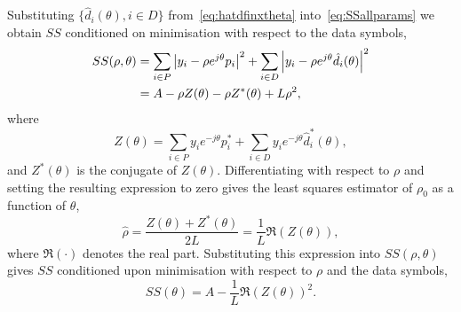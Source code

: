 \documentclass[journal]{IEEEtran}
\begin{document}
Substituting $\{ \hat{d}_i(\theta), i \in D \}$ from~\eqref{eq:hatdfinxtheta} into~\eqref{eq:SSallparams} we obtain $SS$ conditioned on minimisation with respect to the data symbols,
 \begin{align*}
SS(\rho, \theta) &=\sum_{i \in P} {\left\vert  y_i - \rho e^{j\theta} p_i  \right\vert}^2 + \sum_{i \in D} {\left\vert  y_i - \rho e^{j\theta} \hat{d_i}(\theta)  \right\vert}^2 \\
&= A - \rho Z(\theta) - \rho Z^*(\theta) + L \rho^2,
\end{align*}
where
\[
Z(\theta)  = \sum_{i \in P} y_i e^{-j\theta} p_i^* + \sum_{i \in D} y_i e^{-j\theta} \hat{d}_i^*(\theta),
\]
and $Z^*(\theta)$ is the conjugate of $Z(\theta)$.  Differentiating with respect to $\rho$ and setting the resulting expression to zero gives the least squares estimator of $\rho_0$ as a function of $\theta$, 
\begin{equation}\label{eq:hatrhoZ}
\hat{\rho} = \frac{Z(\theta) + Z^*(\theta)}{2L} = \frac{1}{L}\Re(Z(\theta)),
\end{equation}
where $\Re(\cdot)$ denotes the real part.  Substituting this expression into $SS(\rho, \theta)$ gives $SS$ conditioned upon minimisation with respect to $\rho$ and the data symbols,
\[
SS(\theta) = A - \frac{1}{L}\Re(Z(\theta))^2.
\]
\end{document}
